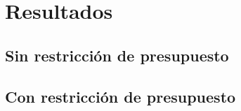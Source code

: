 \chapter{Resultados}

\section{Sin restricción de presupuesto}

\section{Con restricción de presupuesto}